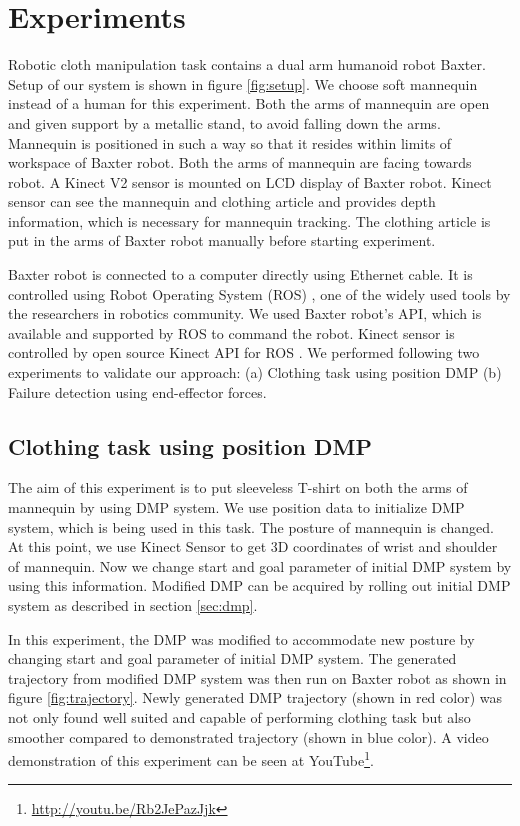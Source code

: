 \documentclass[sigconf]{acmart}
\begin{document}
\section{Experiments}
\label{sec:experiments}
Robotic cloth manipulation task contains a dual arm humanoid robot Baxter. Setup of our system is shown in figure \ref{fig:setup}. We choose soft mannequin instead of a human for this experiment. Both the arms of mannequin are open and given support by a metallic stand, to avoid falling down the arms. Mannequin is positioned in such a way so that it resides within limits of workspace of Baxter robot. Both the arms of mannequin are facing towards robot. A Kinect V2 \cite{microsoft2014kinect} sensor is mounted on LCD display of Baxter robot. Kinect sensor can see the mannequin and clothing article and provides depth information, which is necessary for mannequin tracking. The clothing article is put in the arms of Baxter robot manually before starting experiment.

Baxter robot is connected to a computer directly using Ethernet cable. It is controlled using Robot Operating System (ROS) \cite{quigley2009ros}, one of the widely used tools by the researchers in robotics community. We used Baxter robot's API, which is available and supported by ROS to command the robot. Kinect sensor is controlled by open source Kinect API for ROS \cite{iai_kinect2, libfreenect2}. We performed following two experiments to validate our approach: (a) Clothing task using position DMP (b) Failure detection using end-effector forces.

\subsection{Clothing task using position DMP}
The aim of this experiment is to put sleeveless T-shirt on both the arms of mannequin by using DMP system. We use position data to initialize DMP system, which is being used in this task. The posture of mannequin is changed. At this point, we use Kinect Sensor to get 3D coordinates of wrist and shoulder of mannequin. Now we change start and goal parameter of initial DMP system by using this information. Modified DMP can be acquired by rolling out initial DMP system as described in section \ref{sec:dmp}.

In this experiment, the DMP was modified to accommodate new posture by changing start and goal parameter of initial DMP system. The generated trajectory from modified DMP system was then run on Baxter robot as shown in figure \ref{fig:trajectory}. Newly generated DMP trajectory (shown in red color) was not only found well suited and capable of performing clothing task but also smoother compared to demonstrated trajectory (shown in blue color). A video demonstration of this experiment can be seen at YouTube\footnote{\url{http://youtu.be/Rb2JePazJjk}}.
\end{document}
